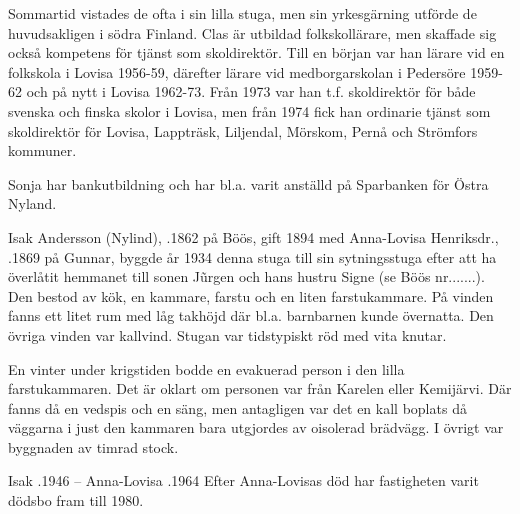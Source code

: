 Sommartid vistades de ofta i sin lilla stuga, men sin yrkesgärning utförde de huvudsakligen i södra Finland. Clas är utbildad folkskollärare, men skaffade sig också kompetens för tjänst som skoldirektör. Till en början var han lärare vid en folkskola i Lovisa 1956-59, därefter lärare vid medborgarskolan i Pedersöre 1959-62 och på nytt i Lovisa 1962-73. Från 1973 var han t.f. skoldirektör för både svenska och finska skolor i Lovisa, men från 1974 fick han ordinarie tjänst som skoldirektör för Lovisa, Lappträsk, Liljendal, Mörskom, Pernå och Strömfors kommuner.

Sonja har bankutbildning och har bl.a. varit anställd på Sparbanken för Östra Nyland.


Isak Andersson (Nylind), .1862 på Böös, gift 1894 med Anna-Lovisa Henriksdr., .1869 på Gunnar, byggde år 1934 denna stuga till sin sytningsstuga efter att ha överlåtit hemmanet till sonen Jũrgen och hans hustru Signe (se Böös nr.......). Den bestod av kök, en kammare, farstu och en liten farstukammare. På vinden fanns ett litet rum med låg takhöjd där bl.a. barnbarnen kunde övernatta. Den övriga vinden var kallvind. Stugan var tidstypiskt röd med vita knutar.

En vinter under krigstiden bodde en evakuerad person i den lilla farstukammaren. Det är oklart om personen var från Karelen eller Kemijärvi. Där fanns då en vedspis och en säng, men antagligen var det en kall boplats då väggarna i just den kammaren bara utgjordes av oisolerad brädvägg. I övrigt var byggnaden av timrad stock.

Isak .1946  -- Anna-Lovisa .1964
Efter Anna-Lovisas död har fastigheten varit dödsbo fram till 1980.

